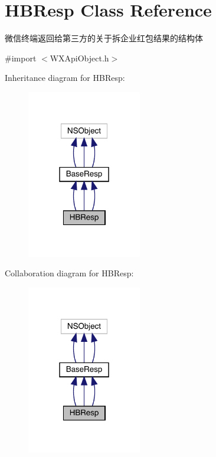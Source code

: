 \hypertarget{interface_h_b_resp}{}\section{H\+B\+Resp Class Reference}
\label{interface_h_b_resp}


微信终端返回给第三方的关于拆企业红包结果的结构体  




{\ttfamily \#import $<$W\+X\+Api\+Object.\+h$>$}



Inheritance diagram for H\+B\+Resp\+:\nopagebreak
\begin{figure}[H]
\begin{center}
\leavevmode
\includegraphics[width=142pt]{interface_h_b_resp__inherit__graph}
\end{center}
\end{figure}


Collaboration diagram for H\+B\+Resp\+:\nopagebreak
\begin{figure}[H]
\begin{center}
\leavevmode
\includegraphics[width=142pt]{interface_h_b_resp__coll__graph}
\end{center}
\end{figure}
